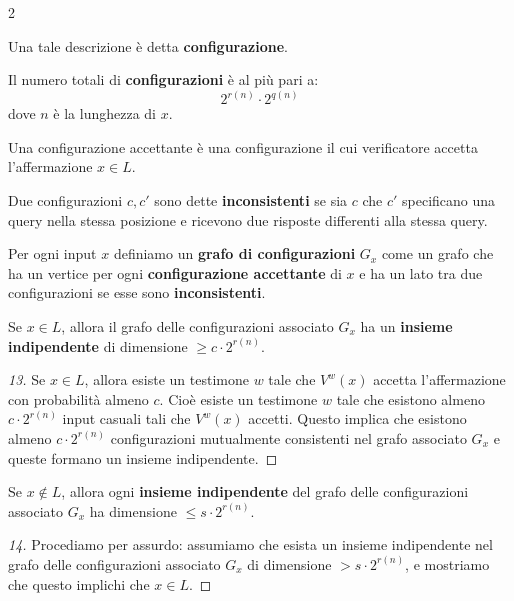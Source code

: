 \documentclass[\main/main.tex]{subfiles}
\begin{document}
\begin{multicols}{2}
\begin{definition}[Configurazione]
    Una tale descrizione è detta \textbf{configurazione}.
\end{definition}
\begin{observation}
    Il numero totali di \textbf{configurazioni} è al più pari a:
    \[
        2^{r(n)} \cdot 2^{q(n)}
    \]
    dove \(n\) è la lunghezza di \(x\).
\end{observation}
\begin{property}
    Una configurazione accettante è una configurazione il cui verificatore accetta l'affermazione \(x \in L\).
\end{property}
\begin{property}
    Due configurazioni \(c, c'\) sono dette \textbf{inconsistenti} se sia \(c\) che \(c'\) specificano una query nella stessa posizione e ricevono due risposte differenti alla stessa query.
\end{property}
\begin{definition}
    Per ogni input \(x\) definiamo un \textbf{grafo di configurazioni} \(G_x\) come un grafo che ha un vertice per ogni \textbf{configurazione accettante} di \(x\) e ha un lato tra due configurazioni se esse sono \textbf{inconsistenti}.
\end{definition}
\begin{claim}[13]
    Se \(x \in L\), allora il grafo delle configurazioni associato \(G_x\) ha un \textbf{insieme indipendente} di dimensione \(\geq c \cdot 2^{r(n)}\).
\end{claim}
\begin{proof}[13]
    Se \(x \in L\), allora esiste un testimone \(w\) tale che \(V^{w}(x)\) accetta l'affermazione con probabilità almeno \(c\). Cioè esiste un testimone \(w\) tale che esistono almeno \(c \cdot 2^{r(n)}\) input casuali tali che \(V^{w}(x)\) accetti. Questo implica che esistono almeno \(c \cdot 2^{r(n)}\) configurazioni mutualmente consistenti nel grafo associato \(G_x\) e queste formano un insieme indipendente.
\end{proof}
\begin{claim}[14]
    Se \(x \not\in L\), allora ogni \textbf{insieme indipendente} del grafo delle configurazioni associato \(G_x\) ha dimensione \(\leq s \cdot 2^{r(n)}\).
\end{claim}
\begin{proof}[14]
    Procediamo per assurdo: assumiamo che esista un insieme indipendente nel grafo delle configurazioni associato \(G_x\) di dimensione \(> s \cdot 2^{r(n)}\), e mostriamo che questo implichi che \(x \in L\).
    

\end{proof}
\end{multicols}
\end{document}
